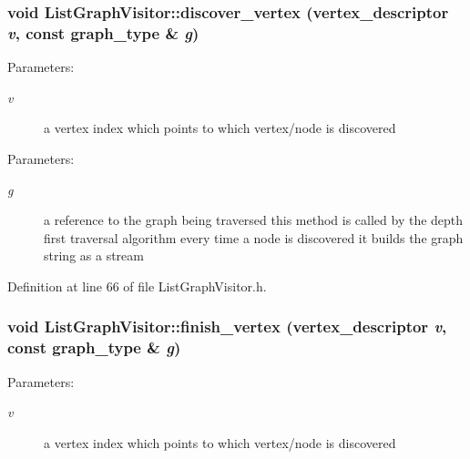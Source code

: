 \subsubsection{\setlength{\rightskip}{0pt plus 5cm}void ListGraphVisitor::discover\_\-vertex ({\bf vertex\_\-descriptor} {\em v}, const {\bf graph\_\-type} \& {\em g})\hspace{0.3cm}{\tt  [inline]}}\label{classListGraphVisitor_435686d2ecb09466647032db850584c3}


\begin{Desc}
\item[Parameters:]
\begin{description}
\item[{\em v}]a vertex index which points to which vertex/node is discovered \end{description}
\end{Desc}


\begin{Desc}
\item[Parameters:]
\begin{description}
\item[{\em g}]a reference to the graph being traversed this method is called by the depth first traversal algorithm every time a node is discovered it builds the graph string as a stream \end{description}
\end{Desc}


Definition at line 66 of file ListGraphVisitor.h.
\subsubsection{\setlength{\rightskip}{0pt plus 5cm}void ListGraphVisitor::finish\_\-vertex ({\bf vertex\_\-descriptor} {\em v}, const {\bf graph\_\-type} \& {\em g})\hspace{0.3cm}{\tt  [inline]}}\label{classListGraphVisitor_9d47bb532f76a2082b8343273cefd63d}


\begin{Desc}
\item[Parameters:]
\begin{description}
\item[{\em v}]a vertex index which points to which vertex/node is discovered \end{description}
\end{Desc}


